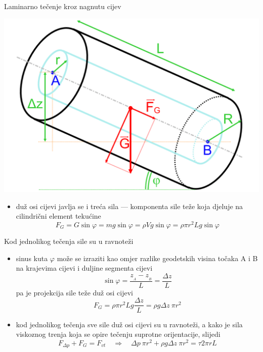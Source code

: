 \documentclass{beamer}
\begin{document}
\begin{frame}{Laminarno tečenje kroz nagnutu cijev}

\begin{center}
\includegraphics[width=0.5\paperwidth]{slike/slika2.PNG}
\par\end{center}
\begin{itemize}
\item duž osi cijevi javlja se i treća sila --- komponenta sile teže koja
djeluje na cilindrični element tekućine
\[
F_{G}=G\sin\varphi=mg\sin\varphi=\rho Vg\sin\varphi=\rho\pi r^{2}Lg\sin\varphi
\]
\end{itemize}
\end{frame}

\begin{frame}{Kod jednolikog tečenja sile su u ravnoteži}

\begin{itemize}
\item sinus kuta $\varphi$ može se izraziti kao omjer razlike geodetskih
visina točaka A i B na krajevima cijevi i duljine segmenta cijevi
\[
\sin\varphi=\frac{z_{_{A}}-z_{_{B}}}{L}=\frac{\Delta z}{L}
\]
pa je projekcija sile teže duž osi cijevi
\[
F_{G}=\rho\pi r^{2}Lg\frac{\Delta z}{L}=\rho g\Delta z\:\pi r^{2}
\]
\item kod jednolikog tečenja sve sile duž osi cijevi su u ravnoteži, a kako
je sila viskoznog trenja koja se opire tečenju suprotne orijentacije,
slijedi 
\[
F_{\Delta p}+F_{G}=F_{vt}\quad\Rightarrow\quad\Delta p\:\pi r^{2}+\rho g\Delta z\:\pi r^{2}=\tau2\pi rL
\]
\end{itemize}
\end{frame}
\end{document}
